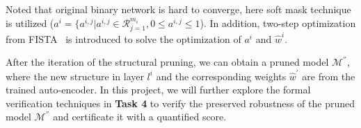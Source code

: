 Noted that original binary network is hard to converge, here soft mask technique is utilized ($a^i=\{a^{i,j}|a^{i,j}\in \mathcal{R}^{m_i}_{j=1}, 0\le a^{i,j}\le 1$). In addition, two-step optimization from FISTA~\cite{denton2014exploiting} is introduced to solve the optimization of $a^i$ and $\hat{w}^i$.

After the iteration of the structural pruning, we can obtain a pruned model $\mathcal{M}^{''}$, where the new structure in layer $l^i$ and the corresponding weights $\hat{w}^{'}$ are from the trained auto-encoder. In this project, we will further explore the formal verification techniques in \textbf{Task 4} to verify the preserved robustness of the pruned model $\mathcal{M}^{''}$ and certificate it with a quantified score.